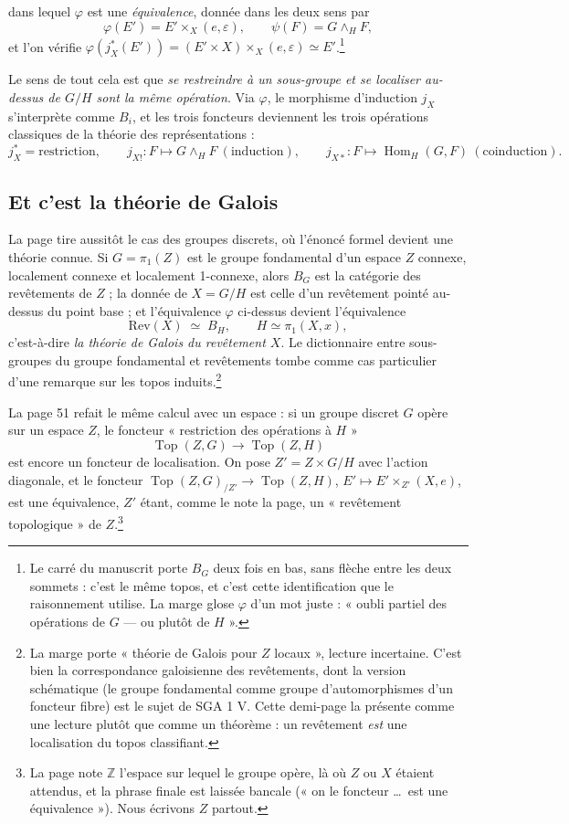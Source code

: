 \documentclass[11pt,a4paper]{article}
\begin{document}
dans lequel $\varphi$ est une \emph{équivalence}, donnée dans les deux sens par
\[
\varphi(E') = E' \times_{X} (e, \varepsilon), \qquad
\psi(F) = G \wedge_{H} F,
\]
et l'on vérifie $\varphi(j_{X}^{*}(E')) = (E' \times X) \times_{X}
(e, \varepsilon) \simeq E'$.\footnote{Le carré du manuscrit porte $B_{G}$ deux
fois en bas, sans flèche entre les deux sommets : c'est le même topos, et
c'est cette identification que le raisonnement utilise. La marge glose
$\varphi$ d'un mot juste : « oubli partiel des opérations de $G$ — ou plutôt de
$H$ ».}

Le sens de tout cela est que \emph{se restreindre à un sous-groupe et se
localiser au-dessus de $G/H$ sont la même opération}. Via $\varphi$, le
morphisme d'induction $j_{X}$ s'interprète comme $B_{i}$, et les trois foncteurs
deviennent les trois opérations classiques de la théorie des représentations :
\[
j_{X}^{*} = \text{restriction}, \qquad
j_{X!} : F \mapsto G \wedge_{H} F \ (\text{induction}), \qquad
j_{X*} : F \mapsto \operatorname{Hom}_{H}(G, F) \ (\text{coinduction}).
\]

\subsection*{Et c'est la théorie de Galois}

La page tire aussitôt le cas des groupes discrets, où l'énoncé formel devient
une théorie connue. Si $G = \pi_{1}(Z)$ est le groupe
fondamental d'un espace $Z$ connexe, localement connexe et localement
1-connexe, alors $B_{G}$ est la catégorie des revêtements de $Z$ ; la donnée de
$X = G/H$ est celle d'un revêtement pointé au-dessus du point base ; et
l'équivalence $\varphi$ ci-dessus devient l'équivalence
\[
\mathrm{Rev}(X) \;\simeq\; B_{H}, \qquad H \simeq \pi_{1}(X,x),
\]
c'est-à-dire \emph{la théorie de Galois du revêtement $X$}. Le dictionnaire
entre sous-groupes du groupe fondamental et revêtements tombe comme cas
particulier d'une remarque sur les topos induits.\footnote{La marge porte
« théorie de Galois pour $Z$ locaux », lecture incertaine. C'est bien la
correspondance galoisienne des revêtements, dont la version schématique (le
groupe fondamental comme groupe d'automorphismes d'un foncteur fibre) est le
sujet de SGA 1 V. Cette demi-page la présente comme une lecture plutôt que
comme un théorème : un revêtement \emph{est} une localisation du
topos classifiant.}

La page 51 refait le même calcul avec un espace : si un groupe discret $G$ opère
sur un espace $Z$, le foncteur « restriction des opérations à $H$ »
\[
\operatorname{Top}(Z, G) \longrightarrow \operatorname{Top}(Z, H)
\]
est encore un foncteur de localisation. On pose $Z' = Z \times G/H$ avec
l'action diagonale, et le foncteur
$\operatorname{Top}(Z,G)_{/Z'} \to \operatorname{Top}(Z,H)$, $E' \mapsto E'
\times_{Z'} (X,e)$, est une équivalence, $Z'$ étant, comme le note la page, un
« revêtement topologique » de $Z$.\footnote{La page note $\mathbb{Z}$ l'espace
sur lequel le groupe opère, là où $Z$ ou $X$ étaient attendus, et la phrase
finale est laissée bancale (« on le foncteur \ldots\ est une équivalence »).
Nous écrivons $Z$ partout.}
\end{document}
